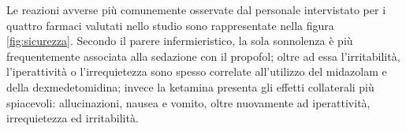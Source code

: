 \vfill

Le reazioni avverse più comunemente osservate dal personale intervistato per i quattro farmaci valutati nello studio sono rappresentate nella figura \ref{fig:sicurezza}. Secondo il parere infermieristico, la sola sonnolenza è più frequentemente associata alla sedazione con il propofol; oltre ad essa l'irritabilità, l'iperattività o l'irrequietezza sono spesso correlate all'utilizzo del midazolam e della dexmedetomidina; invece la ketamina presenta gli effetti collaterali più spiacevoli: allucinazioni, nausea e vomito, oltre nuovamente ad iperattività, irrequietezza ed irritabilità.

